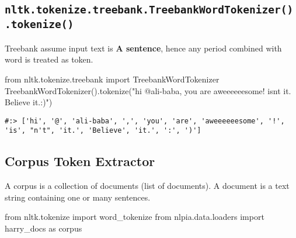 \documentclass[
]{book}
\newenvironment{Shaded}{\begin{snugshade}}{\end{snugshade}}
\newcommand{\ImportTok}[1]{#1}
\newcommand{\NormalTok}[1]{#1}
\newcommand{\StringTok}[1]{\textcolor[rgb]{0.5,0.5,0.5}{#1}}
\begin{document}
\hypertarget{nltk.tokenize.treebank.treebankwordtokenizer.tokenize}{%
\subsection{\texorpdfstring{\texttt{nltk.tokenize.treebank.TreebankWordTokenizer().tokenize()}}{nltk.tokenize.treebank.TreebankWordTokenizer().tokenize()}}\label{nltk.tokenize.treebank.treebankwordtokenizer.tokenize}}

Treebank assume input text is \textbf{A sentence}, hence any period combined with word is treated as token.

\begin{Shaded}
\begin{Highlighting}[]
\ImportTok{from}\NormalTok{ nltk.tokenize.treebank   }\ImportTok{import}\NormalTok{ TreebankWordTokenizer}
\NormalTok{TreebankWordTokenizer().tokenize(}\StringTok{"hi @ali{-}baba, you are aweeeeeesome! isn\textquotesingle{}t it. Believe it.:)"}\NormalTok{)}
\end{Highlighting}
\end{Shaded}

\begin{verbatim}
#:> ['hi', '@', 'ali-baba', ',', 'you', 'are', 'aweeeeeesome', '!', 'is', "n't", 'it.', 'Believe', 'it.', ':', ')']
\end{verbatim}

\hypertarget{corpus-token-extractor}{%
\subsection{Corpus Token Extractor}\label{corpus-token-extractor}}

A corpus is a collection of documents (list of documents). A document is a text string containing one or many sentences.

\begin{Shaded}
\begin{Highlighting}[]
\ImportTok{from}\NormalTok{ nltk.tokenize }\ImportTok{import}\NormalTok{ word\_tokenize}
\ImportTok{from}\NormalTok{ nlpia.data.loaders }\ImportTok{import}\NormalTok{ harry\_docs }\ImportTok{as}\NormalTok{ corpus}
\end{Highlighting}
\end{Shaded}
\end{document}
